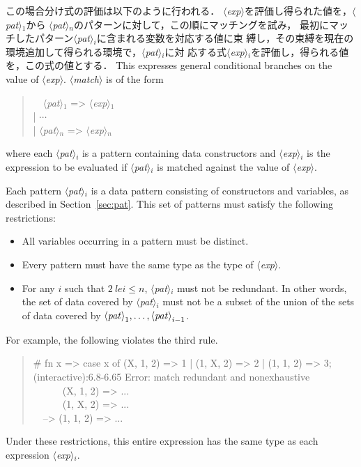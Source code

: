 \documentclass{jbook}
\newcommand{\nonterm}[1]{\mbox{$\langle$}{\it #1}\mbox{$\rangle$}}
\newcommand{\myem}{\mbox{\ \ }}
\newenvironment{program}{\begin{quote}\begin{tt}}%
                        {\end{tt}\end{quote}}
\begin{document}
	この場合分け式の評価は以下のように行われる．
	\nonterm{exp}を評価し得られた値を，\nonterm{pat}$_1$から
\nonterm{pat}$_n$のパターンに対して，この順にマッチングを試み，
最初にマッチしたパターン\nonterm{pat}$_i$に含まれる変数を対応する値に束
縛し，その束縛を現在の環境追加して得られる環境で，\nonterm{pat}$_i$に対
応する式\nonterm{exp}$_i$を評価し，得られる値を，この式の値とする．
\else%
	This expresses general conditional branches on the
value of \nonterm{exp}.
	\nonterm{match} is of the form
\begin{program}
\myem  \nonterm{pat}$_1$ => \nonterm{exp}$_1$
\\
| $\cdots$
\\
| \nonterm{pat}$_n$ => \nonterm{exp}$_n$
\end{program}
where each \nonterm{pat}$_i$ is a pattern containing data constructors
and \nonterm{exp}$_i$ is the expression to be evaluated if
\nonterm{pat}$_i$ is matched against the value of \nonterm{exp}.

	Each pattern \nonterm{pat}$_i$ is a data pattern
consisting of constructors and variables,
as described in Section~\ref{sec:pat}.
	This set of patterns must satisfy the following restrictions:
\begin{itemize}
\item All variables occurring in a pattern must be
distinct.
\item Every pattern must have the same type as the type of \nonterm{exp}.
\item For any $i$ such that $2\ le i \le n$,
\nonterm{pat}$_i$ must not be redundant.
	In other words,
the set of data covered by \nonterm{pat}$_i$
must not be a subset of the union of the sets of data covered by
$\nonterm{pat}_1, \ldots, \nonterm{pat}_{i-1}$.
\end{itemize}
	For example, the following violates the third rule.
\begin{program}
\# fn x => case x of (X, 1, 2) => 1 | (1, X, 2) => 2 | (1, 1, 2) => 3;
\\
(interactive):6.8-6.65 Error: match redundant and nonexhaustive
\\
\myem\myem\myem  (X, 1, 2) => ...
\\
\myem\myem\myem  (1, X, 2) => ...
\\
\myem --> (1, 1, 2) => ...
\end{program}
	Under these restrictions,
this entire expression has the same type as each expression
\nonterm{exp}$_i$.
\end{document}
